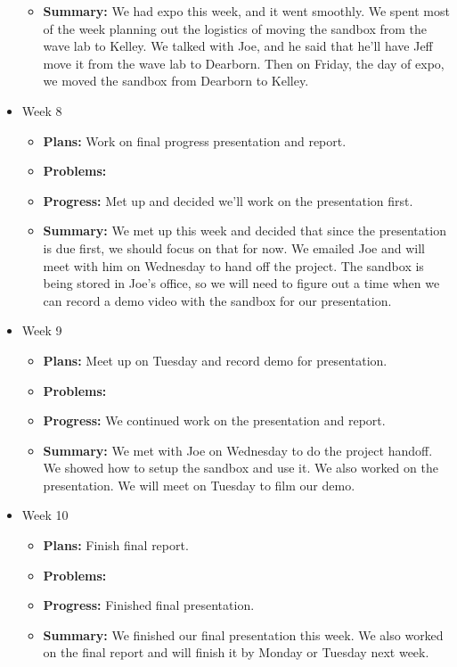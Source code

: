 \documentclass[onecolumn, draftclsnofoot,10pt, compsoc]{IEEEtran}
\begin{document}
\begin{itemize}
\begin{itemize}
    \item \textbf{Summary:} We had expo this week, and it went smoothly. We spent most of the week planning out the logistics of moving the sandbox from the wave lab to Kelley. We talked with Joe, and he said that he'll have Jeff move it from the wave lab to Dearborn. Then on Friday, the day of expo, we moved the sandbox from Dearborn to Kelley.
	\end{itemize}
\item Week 8
	\begin{itemize}
	\item \textbf{Plans:} Work on final progress presentation and report.
    \item \textbf{Problems:} 
    \item \textbf{Progress:} Met up and decided we'll work on the presentation first.
    \item \textbf{Summary:} We met up this week and decided that since the presentation is due first, we should focus on that for now. We emailed Joe and will meet with him on Wednesday to hand off the project. The sandbox is being stored in Joe's office, so we will need to figure out a time when we can record a demo video with the sandbox for our presentation.
	\end{itemize}
\item Week 9
	\begin{itemize}
	\item \textbf{Plans:} Meet up on Tuesday and record demo for presentation.
    \item \textbf{Problems:}
    \item \textbf{Progress:} We continued work on the presentation and report.
    \item \textbf{Summary:} We met with Joe on Wednesday to do the project handoff. We showed how to setup the sandbox and use it. We also worked on the presentation. We will meet on Tuesday to film our demo.
	\end{itemize}
\item Week 10
	\begin{itemize}
	\item \textbf{Plans:} Finish final report.
    \item \textbf{Problems:}
    \item \textbf{Progress:} Finished final presentation.
    \item \textbf{Summary:} We finished our final presentation this week. We also worked on the final report and will finish it by Monday or Tuesday next week.
	\end{itemize}
\end{itemize}
\end{document}
